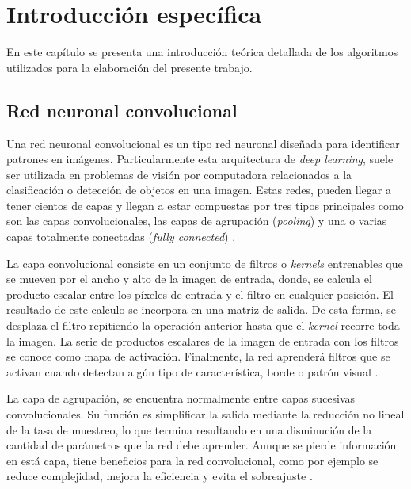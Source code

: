 \chapter{Introducción específica} %

\label{Chapter2}

En este capítulo se presenta una introducción teórica detallada de los algoritmos utilizados para la elaboración del presente trabajo.

\section{Red neuronal convolucional}

Una red neuronal convolucional es un tipo red neuronal diseñada para identificar patrones en imágenes. Particularmente esta arquitectura de \textit{deep learning}, suele ser utilizada en problemas de visión por computadora relacionados a la clasificación o detección de objetos en una imagen. Estas redes, pueden llegar a tener cientos de capas y llegan a estar compuestas por tres tipos principales como son las capas convolucionales, las capas de agrupación (\textit{pooling}) y una o varias capas totalmente conectadas (\textit{fully connected}) \cite{WEBSITE:2}\cite{WEBSITE:3}\cite{WEBSITE:4}.

La capa convolucional consiste en un conjunto de filtros o \textit{kernels} entrenables que se mueven por el ancho y alto de la imagen de entrada, donde, se calcula el producto escalar entre los píxeles de entrada y el filtro en cualquier posición. El resultado de este calculo se incorpora en una matriz de salida. De esta forma, se desplaza el filtro repitiendo la operación anterior hasta que el \textit{kernel} recorre toda la imagen. La serie de productos escalares de la imagen de entrada con los filtros se conoce como mapa de activación. Finalmente, la red aprenderá filtros que se activan cuando detectan algún tipo de característica, borde o patrón visual \cite{WEBSITE:3}\cite{WEBSITE:4}.

La capa de agrupación, se encuentra normalmente entre capas sucesivas convolucionales. Su función es simplificar la salida mediante la reducción no lineal de la tasa de muestreo, lo que termina resultando en una disminución de la cantidad de parámetros que la red debe aprender. Aunque se pierde información en está capa, tiene beneficios para la red convolucional, como por ejemplo se reduce complejidad, mejora la eficiencia y evita el sobreajuste \cite{WEBSITE:3}\cite{WEBSITE:4}.

